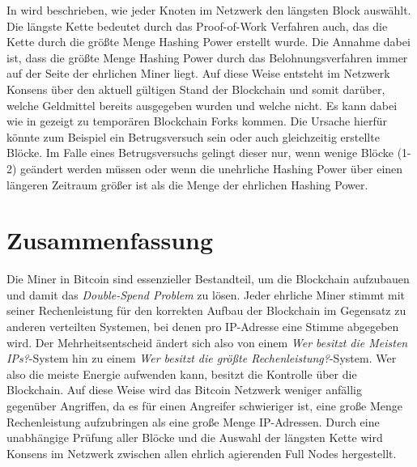 \documentclass[ngerman,runningheads,a4paper]{llncs}[2018/03/10]
\begin{document}
In  wird beschrieben, wie jeder Knoten im Netzwerk den längsten Block auswählt. Die längste Kette bedeutet durch das Proof-of-Work Verfahren auch, das die Kette durch die größte Menge Hashing Power erstellt wurde. Die Annahme dabei ist, dass die größte Menge Hashing Power durch das Belohnungsverfahren immer auf der Seite der ehrlichen Miner liegt. Auf diese Weise entsteht im Netzwerk Konsens über den aktuell gültigen Stand der Blockchain und somit darüber, welche Geldmittel bereits ausgegeben wurden und welche nicht. Es kann dabei wie in  gezeigt zu temporären Blockchain Forks kommen. Die Ursache hierfür könnte zum Beispiel ein Betrugsversuch sein oder auch gleichzeitig erstellte Blöcke. Im Falle eines Betrugsversuchs gelingt dieser nur, wenn wenige Blöcke (1-2) geändert werden müssen oder wenn die unehrliche Hashing Power über einen längeren Zeitraum größer ist als die Menge der ehrlichen Hashing Power.

\section{Zusammenfassung}\label{sec:Zusammenfassung}

Die Miner in Bitcoin sind essenzieller Bestandteil, um die Blockchain aufzubauen und damit das \textit{Double-Spend Problem} zu lösen. Jeder ehrliche Miner stimmt mit seiner Rechenleistung für den korrekten Aufbau der Blockchain im Gegensatz zu anderen verteilten Systemen, bei denen pro IP-Adresse eine Stimme abgegeben wird. Der Mehrheitsentscheid ändert sich also von einem \textit{Wer besitzt die Meisten IPs?}-System hin zu einem \textit{Wer besitzt die größte Rechenleistung?}-System. Wer also die meiste Energie aufwenden kann, besitzt die Kontrolle über die Blockchain. Auf diese Weise wird das Bitcoin Netzwerk weniger anfällig gegenüber Angriffen, da es für einen Angreifer schwieriger ist, eine große Menge Rechenleistung aufzubringen als eine große Menge IP-Adressen. Durch eine unabhängige Prüfung aller Blöcke und die Auswahl der längsten Kette wird Konsens im Netzwerk zwischen allen ehrlich agierenden Full Nodes hergestellt.
\end{document}
